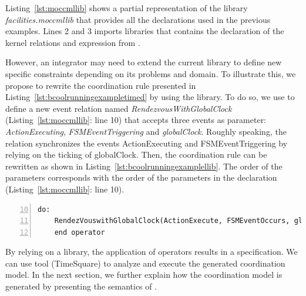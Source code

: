 Listing~\ref{lst:moccmllib} shows a partial representation of the \moccml library \emph{facilities.moccmllib} that provides all the declarations used in the previous examples. Lines 2 and 3 imports \ccsl libraries that contains the declaration of the kernel relations and expression from \ccsl. 

However, an integrator may need to extend the current library to define new specific constraints depending on its problems and domain. To illustrate this, we propose to rewrite the coordination rule presented in Listing~\ref{lst:bcoolrunningexampletimed} by using the library. To do so, we use \moccml to define a new event relation named \emph{RendezvousWithGlobalClock} (Listing~\ref{lst:moccmllib}: line 10) that accepts three events as parameter: \emph{ActionExecuting}, \emph{FSMEventTriggering} and \emph{globalClock}. Roughly speaking, the relation synchronizes the events ActionExecuting and FSMEventTriggering by relying on the ticking of globalClock. Then, the coordination rule can be rewritten as shown in Listing~\ref{lst:bcoolrunningexamplellib}. The order of the parameters corresponds with the order of the parameters in the declaration (Listing~\ref{lst:moccmllib}: line 10). 

	\begin{lstlisting}[language=bcool,
	caption={Synchronized product operator between the TFSM and Activity languages by using the library},
	label={lst:bcoolrunningexamplellib}, 
	basicstyle=\scriptsize\ttfamily, backgroundcolor=\color{LGrey}, numbers=left, firstnumber=10, xleftmargin=2pt]
	do: 
	RendezVouswithGlobalClock(ActionExecute, FSMEventOccurs, globalClock)
	end operator
	\end{lstlisting}

By relying on a \moccml library, the application of \bcool operators results in a \ccsl specification. We can use \ccsl tool (\eg TimeSquare\cite{timesquarebib}) to analyze and execute the generated coordination model. In the next section, we further explain how the coordination model is generated by presenting the semantics of \bcool.   


	
